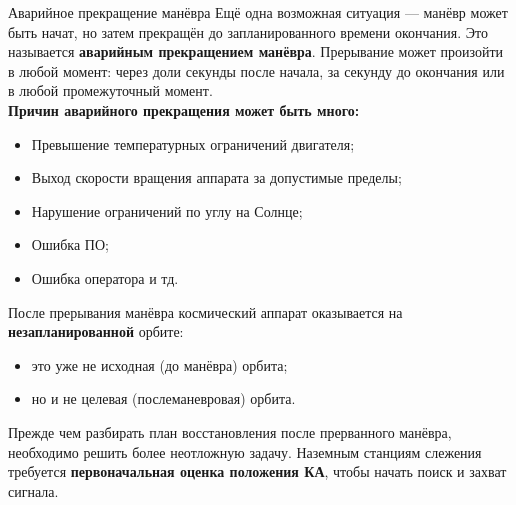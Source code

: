 \documentclass[8pt]{beamer}
\begin{document}
\begin{frame}{Аварийное прекращение манёвра}
Ещё одна возможная ситуация — манёвр может быть начат, но затем прекращён до запланированного времени окончания. Это называется \textbf{аварийным прекращением манёвра}. Прерывание может произойти в любой момент: через доли секунды после начала, за секунду до окончания или в любой промежуточный момент. \\
\smallskip
\textbf{Причин аварийного прекращения может быть много:}
\begin{itemize}
    \item Превышение температурных ограничений двигателя;
    \item Выход скорости вращения аппарата за допустимые пределы;
    \item Нарушение ограничений по углу на Солнце;
    \item Ошибка ПО;
    \item Ошибка оператора и тд.
\end{itemize}
После прерывания манёвра космический аппарат оказывается на \textbf{незапланированной} орбите:
\begin{itemize}
    \item это уже не исходная (до манёвра) орбита;
    \item но и не целевая (послеманевровая) орбита.
\end{itemize}
Прежде чем разбирать план восстановления после прерванного манёвра, необходимо решить более неотложную задачу. Наземным станциям слежения требуется \textbf{первоначальная оценка положения КА}, чтобы начать поиск и захват сигнала.
\end{frame}
\end{document}
